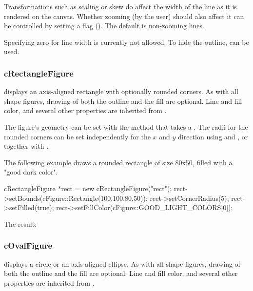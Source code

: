 Transformations such as scaling or skew do affect the width of the line as it
is rendered on the canvas. Whether zooming (by the user) should also affect
it can be controlled by setting a flag ().
The default is non-zooming lines.

Specifying zero for line width is currently not allowed. To hide the outline,
 can be used.


\subsubsection{cRectangleFigure}
\label{sec:graphics:rectanglefigure}

 displays an axis-aligned rectangle with
optionally rounded corners. As with all shape figures, drawing of both the
outline and the fill are optional. Line and fill color, and several other
properties are inherited from .

The figure's geometry can be set with the  method that
takes a . The radii for the rounded corners can
be set independently for the $x$ and $y$ direction using
 and , or together with
.

The following example draws a rounded rectangle of size 80x50, filled with
a "good dark color".

\begin{cpp}
cRectangleFigure *rect = new cRectangleFigure("rect");
rect->setBounds(cFigure::Rectangle(100,100,80,50));
rect->setCornerRadius(5);
rect->setFilled(true);
rect->setFillColor(cFigure::GOOD_LIGHT_COLORS[0]);
\end{cpp}


The result:

\begin{center}

\end{center}


\subsubsection{cOvalFigure}
\label{sec:graphics:ovalfigure}

 displays a circle or an axis-aligned ellipse. As with
all shape figures, drawing of both the outline and the fill are optional.
Line and fill color, and several other properties are inherited from
.


